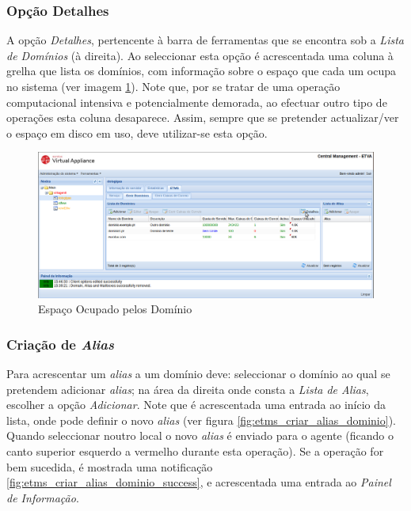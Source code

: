 \subsubsection{Opção Detalhes}
\label{sec:etms_sub_detalhes_dominio}
A opção \textit{Detalhes}, pertencente à barra de ferramentas que se encontra sob a \textit{Lista de Domínios} (à direita). Ao seleccionar esta opção é acrescentada uma coluna à grelha que lista os domínios, com informação sobre o espaço que cada um ocupa no sistema (ver imagem \ref{fig:etms_domain_details}). Note que, por se tratar de uma operação computacional intensiva e potencialmente demorada, ao efectuar outro tipo de operações esta coluna desaparece. Assim, sempre que se pretender actualizar/ver o espaço em disco em uso, deve utilizar-se esta opção.

\begin{figure}[H]
    \begin{center}
    \includegraphics[scale=0.35]{screenshots/etms/etms_domain_details.png}
    \caption{Espaço Ocupado pelos Domínio}
    \label{fig:etms_domain_details}
    \end{center}
\end{figure}

\subsubsection{Criação de \textit{Alias}}
\label{sec:etms_sub_criacao_alias_dominio}
Para acrescentar um \textit{alias} a um domínio deve: seleccionar o domínio ao qual se pretendem adicionar \textit{alias}; na área da direita onde consta a \textit{Lista de Alias}, escolher a opção \textit{Adicionar}. Note que é acrescentada uma entrada ao início da lista, onde pode definir o novo \textit{alias} (ver figura \ref{fig:etms_criar_alias_dominio}). Quando seleccionar noutro local o novo \textit{alias} é enviado para o agente (ficando o canto superior esquerdo a vermelho durante esta operação). Se a operação for bem sucedida, é mostrada uma notificação \ref{fig:etms_criar_alias_dominio_success}, e acrescentada uma entrada ao \textit{Painel de Informação}.


